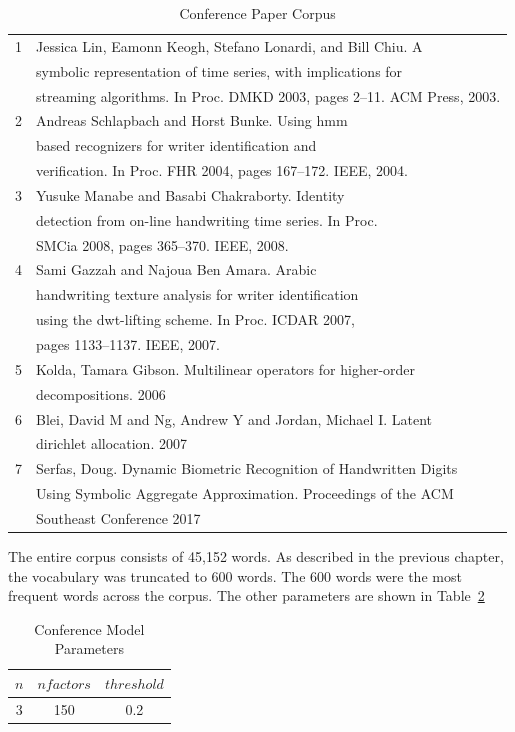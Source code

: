\documentclass[../ut-dissertation.tex]{subfiles}
\begin{document}
\begin{table}
  \centering
  \begin{tabular}{|l|l|}
    \hline
    1 & Jessica Lin, Eamonn Keogh, Stefano Lonardi, and Bill Chiu. A\\
      & symbolic representation of time series, with implications for\\
      & streaming algorithms. In Proc. DMKD 2003, pages 2–11. ACM
        Press, 2003.\\
    \hline
    2 & Andreas Schlapbach and Horst Bunke. Using hmm\\
      & based recognizers for writer identification and\\
      & verification. In Proc. FHR 2004, pages 167–172. IEEE, 2004.\\
    \hline
    3 & Yusuke Manabe and Basabi Chakraborty. Identity\\
      & detection from on-line handwriting time series. In Proc.\\
      & SMCia 2008, pages 365–370. IEEE, 2008.\\
    \hline
    4 & Sami Gazzah and Najoua Ben Amara. Arabic \\
      & handwriting texture analysis for writer identification\\
      & using the dwt-lifting scheme. In Proc. ICDAR 2007,\\
      & pages 1133–1137. IEEE, 2007.\\
    \hline
    5 & Kolda, Tamara Gibson. Multilinear operators for higher-order \\
      & decompositions. 2006\\
    \hline
    6 & Blei, David M and Ng, Andrew Y and Jordan, Michael I. Latent\\
      & dirichlet allocation. 2007\\
    \hline
    \hline
    7 & Serfas, Doug. Dynamic Biometric Recognition of Handwritten Digits\\
      & Using Symbolic Aggregate Approximation. Proceedings of the ACM\\
      & Southeast Conference 2017\\
    \hline
  \end{tabular}
  \caption{Conference Paper Corpus}\label{tab:conference_corpus}
\end{table}

The entire corpus consists of 45,152 words.  As described in the
previous chapter, the vocabulary was truncated to 600 words.  The 600
words were the most frequent words across the corpus.  The other
parameters are shown in Table~\ref{tab:model_parameters}
\begin{table}
  \centering
  \begin{tabular}{ccc}
    \hline
    $n$ & $nfactors$ & $threshold$\\
    \hline
    3 & 150 & 0.2\\
    \hline
  \end{tabular}
  \caption{Conference Model Parameters}\label{tab:model_parameters}
\end{table}
\end{document}
